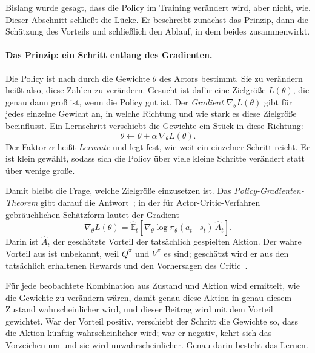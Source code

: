 Bislang wurde gesagt, dass die Policy im Training verändert wird, aber nicht,
wie. Dieser Abschnitt schließt die Lücke. Er beschreibt zunächst das Prinzip,
dann die Schätzung des Vorteils und schließlich den Ablauf, in dem beides
zusammenwirkt.

\paragraph{Das Prinzip: ein Schritt entlang des Gradienten.} Die Policy
ist nach  durch die Gewichte
$\theta$ des Actors bestimmt. Sie zu verändern heißt also, diese Zahlen zu
verändern. Gesucht ist dafür eine Zielgröße $L(\theta)$, die genau dann groß
ist, wenn die Policy gut ist. Der \emph{Gradient} $\nabla_{\theta} L(\theta)$
gibt für jedes einzelne Gewicht an, in welche Richtung und wie stark es diese
Zielgröße beeinflusst. Ein Lernschritt verschiebt die Gewichte ein Stück in
diese Richtung:
%
\begin{equation}
  \theta \leftarrow \theta + \alpha \, \nabla_{\theta} L(\theta).
  \label{eq:gradientenschritt}
\end{equation}
%
Der Faktor $\alpha$ heißt \emph{Lernrate} und legt fest, wie weit ein einzelner
Schritt reicht. Er ist klein gewählt, sodass sich die Policy über viele kleine
Schritte verändert statt über wenige große.

Damit bleibt die Frage, welche Zielgröße einzusetzen ist. Das
\emph{Policy-Gradienten-Theorem} gibt darauf die
Antwort~\cite[Abschn.~13.2--13.5]{suttonbarto2018}; in der für Actor-Critic-Ver\-fahren
gebräuchlichen Schätzform lautet der
Gradient~\cite[Gl.~(1)]{schulman2017ppo}
%
\begin{equation}
  \nabla_{\theta} L(\theta) = \hat{\mathbb{E}}_t\!\left[
    \nabla_{\theta} \log \pi_{\theta}(a_t \mid s_t)\, \hat{A}_t \right].
  \label{eq:policygradient}
\end{equation}
%
Darin ist $\hat{A}_t$ der geschätzte Vorteil der tatsächlich gespielten Aktion.
Der wahre Vorteil aus  ist unbekannt, weil $Q^{\pi}$ und
$V^{\pi}$ es sind; geschätzt wird er aus den tatsächlich erhaltenen Rewards und
den Vorhersagen des Critic~\cite{schulman2018gae}.

Für jede beobachtete Kombination aus Zustand und Aktion wird ermittelt, wie die
Gewichte zu verändern wären, damit genau diese Aktion in genau diesem Zustand
wahrscheinlicher wird, und dieser Beitrag wird mit dem Vorteil gewichtet. War
der Vorteil positiv, verschiebt der Schritt die Gewichte so, dass die Aktion
künftig wahrscheinlicher wird; war er negativ, kehrt sich das Vorzeichen um und
sie wird unwahrscheinlicher. Genau darin besteht das Lernen.

